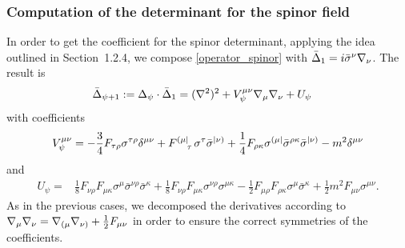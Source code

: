 \subsubsection{Computation of the determinant for the spinor field}


In order to get the coefficient for the spinor determinant, applying the idea outlined in Section~1.2.4, we compose \eqref{operator_spinor} with \(\bar \Delta_1 = i \bar \sigma^\nu { \mathcal{\nabla} }_\nu \). The result is
\begin{equation}
\begin{split}
	\bar \Delta_{\psi+1}
& :=
	\Delta_\psi \cdot \bar \Delta_1
= ({ \mathcal{\nabla} }^2)^2
+
V_\psi^{\mu\nu} { \mathcal{\nabla} }_{\mu} { \mathcal{\nabla} }_{\nu}
+
U_\psi
\end{split}
\end{equation}
with coefficients
\begin{equation}\label{N=1-Vmunu}
V_\psi^{\mu\nu}
=
- \frac{3}{4}  F_{\tau\rho} \sigma^{\tau\rho} \delta^{\mu\nu}
+ F\indices{^{(\mu|}_\tau} \sigma^{\tau} \bar \sigma^{|\nu)}
+ \frac{1}{4} F_{\rho\kappa} \sigma^{(\mu|} \bar \sigma^{\rho \kappa} \bar \sigma^{|\nu)}
- m^2 \delta^{\mu\nu}
\end{equation}
and
\begin{equation}\label{Upsi}
\begin{split}
U_\psi
=
& 
\frac{1}{8} F_{\nu\rho} F_{\mu\kappa}
 	 \sigma^{ \mu } \bar \sigma^{\nu\rho} \bar \sigma^{\kappa }
+ \frac{1}{8} F_{\nu\rho} F_{\mu\kappa}
	 \sigma^{ \nu \rho } \sigma^{\mu \kappa}  
- \frac{1}{2} F_{ \mu \rho } F_{ \rho \kappa }
	\sigma^{ \mu } \bar \sigma^{\kappa}
+ \frac{1}{2} m^2 F_{\mu\nu} \sigma^{\mu\nu} 	.
\end{split}
\end{equation}
As in the previous cases, we decomposed the derivatives according to \({ \mathcal{\nabla} }_\mu { \mathcal{\nabla} }_\nu = { \mathcal{\nabla} }_{(\mu}{ \mathcal{\nabla} }_{\nu)} + \frac{1}{2} F_{\mu\nu} \) in order to ensure the correct symmetries of the coefficients. 




